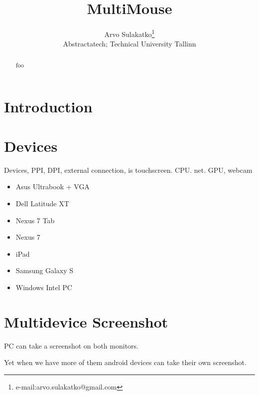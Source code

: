 \documentclass[annual]{acmsiggraph}
\title{MultiMouse}
\author{Arvo Sulakatko\thanks{e-mail:arvo.sulakatko@gmail.com}\\Abstractatech; Technical University Tallinn}
\begin{document}

\maketitle

\begin{abstract}
foo

\end{abstract}

\section{Introduction}


\section{Devices}

Devices, PPI, DPI, external connection, is touchscreen. CPU. net. GPU,
webcam

\begin{itemize}
\item Asus Ultrabook + VGA
\item Dell Latitude XT
\item Nexus 7 Tab
\item Nexus 7 
\item iPad
\item Samsung Galaxy S
\item Windows Intel PC
 
\end{itemize}


\section{Multidevice Screenshot}
PC can take a screenshot on both monitors. 

Yet when we have more of them android devices can take their own screenshot.

\end{document}
